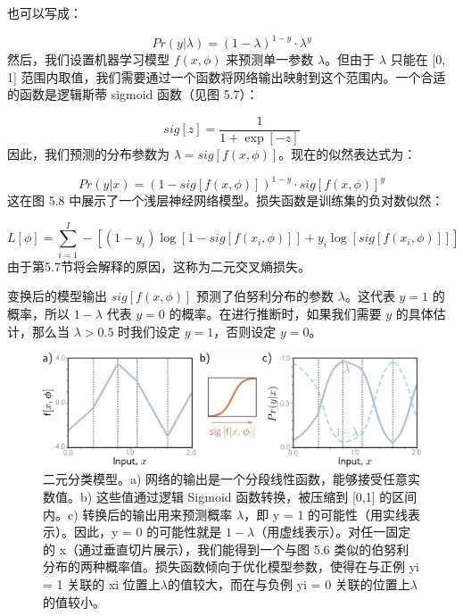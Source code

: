 也可以写成：

\begin{equation}
Pr(y|\lambda) = (1 - \lambda)^{1-y} \cdot \lambda^y 
\end{equation}
然后，我们设置机器学习模型 \(f(x, \phi)\) 来预测单一参数 \(\lambda\)。但由于 \(\lambda\) 只能在 [0, 1] 范围内取值，我们需要通过一个函数将网络输出映射到这个范围内。一个合适的函数是逻辑斯蒂 sigmoid 函数（见图 5.7）：

\begin{equation}
sig[z] = \frac{1}{1 + \exp[-z]} 
\end{equation}
因此，我们预测的分布参数为 \(\lambda = sig[f(x, \phi)]\)。现在的似然表达式为：

\begin{equation}
Pr(y|x) = (1 - sig[f(x, \phi)])^{1-y} \cdot sig[f(x, \phi)]^y 
\end{equation}
这在图 5.8 中展示了一个浅层神经网络模型。损失函数是训练集的负对数似然：

\begin{equation}
L[\phi] = \sum_{i=1}^{I} -\left[(1 - y_i) \log [1 - sig[f(x_i, \phi)]] + y_i \log [sig[f(x_i, \phi)]]\right] 
\end{equation}
由于第5.7节将会解释的原因，这称为二元交叉熵损失。

变换后的模型输出 \(sig[f(x, \phi)]\) 预测了伯努利分布的参数 \(\lambda\)。这代表 \(y = 1\) 的概率，所以 \(1 - \lambda\) 代表 \(y = 0\) 的概率。在进行推断时，如果我们需要 \(y\) 的具体估计，那么当 \(\lambda > 0.5\) 时我们设定 \(y = 1\)，否则设定 \(y = 0\)。


\begin{figure}[ht!]
	\centering
	\includegraphics[width=0.7\linewidth]{png/chapter5/LossBinaryClassification.png}
	\caption{二元分类模型。a) 网络的输出是一个分段线性函数，能够接受任意实数值。b) 这些值通过逻辑 Sigmoid 函数转换，被压缩到 [0,1] 的区间内。c) 转换后的输出用来预测概率 \(\lambda\)，即 y = 1 的可能性（用实线表示）。因此，y = 0 的可能性就是 \(1 − \lambda\)（用虚线表示）。对任一固定的 x（通过垂直切片展示），我们能得到一个与图 5.6 类似的伯努利分布的两种概率值。损失函数倾向于优化模型参数，使得在与正例 yi = 1 关联的 xi 位置上\(\lambda\)的值较大，而在与负例 yi = 0 关联的位置上\(\lambda\)的值较小。}
\end{figure}



